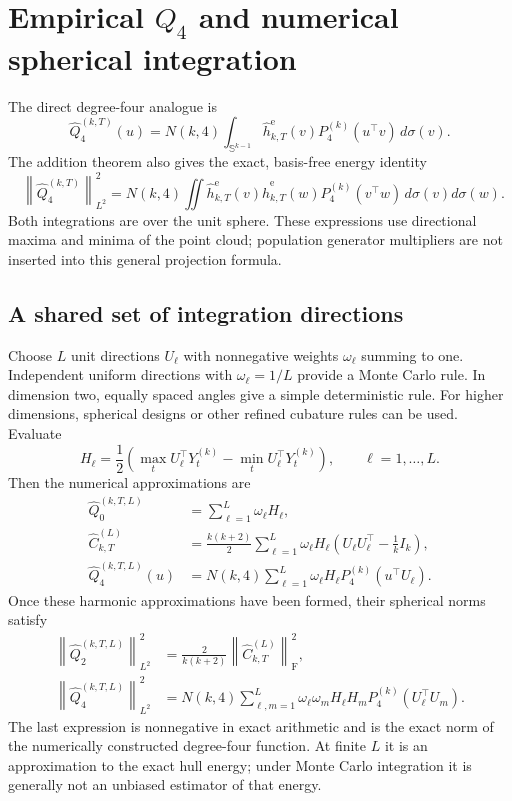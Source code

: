 \documentclass[11pt,a4paper]{article}
\newcommand{\Sph}{\mathbb S}
\newcommand{\norm}[1]{\left\lVert #1\right\rVert}
\newcommand{\Frob}{\mathrm F}
\newcommand{\he}{\widehat h^{\mathrm e}}
\newcommand{\hQ}{\widehat Q}
\newcommand{\hC}{\widehat C}
\begin{document}
\newpage
\section{Empirical \texorpdfstring{$Q_4$}{Q4} and numerical spherical integration}\label{sec:numerics}
The direct degree-four analogue is
\[
 \boxed{\quad
 \hQ_4^{(k,T)}(u)=N(k,4)\int_{\Sph^{k-1}}
 \he_{k,T}(v)P_4^{(k)}(u^\top v)\,d\sigma(v).
 \quad}
\]
The addition theorem also gives the exact, basis-free energy identity
\[
 \boxed{\quad
 \norm{\hQ_4^{(k,T)}}_{L^2}^2
 =N(k,4)\iint
 \he_{k,T}(v)\he_{k,T}(w)P_4^{(k)}(v^\top w)\,d\sigma(v)d\sigma(w).
 \quad}
\]
Both integrations are over the unit sphere. These expressions use directional
maxima and minima of the point cloud; population generator multipliers are not
inserted into this general projection formula.

\subsection*{A shared set of integration directions}
Choose $L$ unit directions $U_\ell$ with nonnegative weights $\omega_\ell$ summing
to one. Independent uniform directions with $\omega_\ell=1/L$ provide a Monte
Carlo rule. In dimension two, equally spaced angles give a simple deterministic
rule. For higher dimensions, spherical designs or other refined cubature rules
can be used. Evaluate
\[
 H_\ell=\frac12\left(\max_tU_\ell^\top Y_t^{(k)}-
 \min_tU_\ell^\top Y_t^{(k)}\right),\qquad \ell=1,\ldots,L.
\]
Then the numerical approximations are
\begin{align*}
 \hQ_0^{(k,T,L)}&=\sum_{\ell=1}^L\omega_\ell H_\ell,\\
 \hC_{k,T}^{(L)}&=\frac{k(k+2)}2\sum_{\ell=1}^L\omega_\ell H_\ell
 \left(U_\ell U_\ell^\top-\frac1kI_k\right),\\
 \hQ_4^{(k,T,L)}(u)&=N(k,4)\sum_{\ell=1}^L\omega_\ell H_\ell
 P_4^{(k)}(u^\top U_\ell).
\end{align*}
Once these harmonic approximations have been formed, their spherical norms satisfy
\begin{align*}
 \norm{\hQ_2^{(k,T,L)}}_{L^2}^2
 &=\frac{2}{k(k+2)}\norm{\hC_{k,T}^{(L)}}_{\Frob}^2,\\
 \norm{\hQ_4^{(k,T,L)}}_{L^2}^2
 &=N(k,4)\sum_{\ell,m=1}^L\omega_\ell\omega_mH_\ell H_m
 P_4^{(k)}(U_\ell^\top U_m).
\end{align*}
The last expression is nonnegative in exact arithmetic and is the exact norm of
the numerically constructed degree-four function. At finite $L$ it is an
approximation to the exact hull energy; under Monte Carlo integration it is
generally not an unbiased estimator of that energy.
\end{document}
